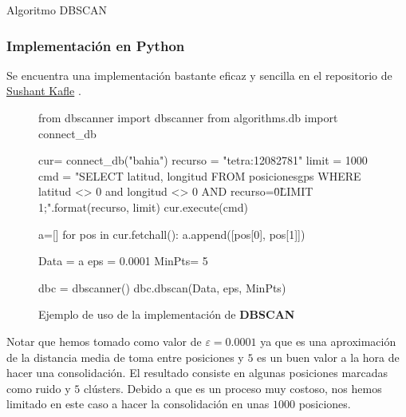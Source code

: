 \documentclass[a4paper, 12pt, spanish]{article}
\begin{document}
\begin{algorithm}[H]\label{DBSCAN}
\begin{algorithmic}[1]
		\Else
			\Else
			\EndIf
		
		\EndIf
	\EndFor
\EndFunction
\State{}
			\EndIf
		\EndIf
		\EndIf
	\EndFor
\EndFunction
\State{}
\EndFunction
\end{algorithmic}
\caption{\label{alg:DBSCAN} Algoritmo DBSCAN}
\end{algorithm}

\subsubsection{Implementaci\'on en Python}

Se encuentra una implementaci\'on bastante eficaz y sencilla en el repositorio de \href{https://github.com/SushantKafle/DBSCAN}{Sushant Kafle} \cite{dbscanPython}.\\

\begin{figure}[H]
\begin{python}
from dbscanner import dbscanner
from algorithms.db import connect_db

cur= connect_db("bahia")
recurso = "tetra:12082781"
limit = 1000
cmd = "SELECT latitud, longitud 
	   FROM posicionesgps 
	   WHERE latitud <> 0 and longitud <> 0 
	   AND recurso=\"{0}\" 
	   LIMIT {1};".format(recurso, limit)
cur.execute(cmd)

a=[]
for pos in cur.fetchall():
    a.append([pos[0], pos[1]])

Data = a
eps = 0.0001
MinPts= 5

dbc = dbscanner()
dbc.dbscan(Data, eps, MinPts)
\end{python}
\caption{Ejemplo de uso de la implementaci\'on de \textbf{DBSCAN}}
\end{figure}
\bigskip
Notar que hemos tomado como valor de $\varepsilon = 0.0001$ ya que es una aproximaci\'on de la distancia media de toma entre posiciones y $5$ es un buen valor a la hora de hacer una consolidaci\'on. El resultado consiste en algunas posiciones marcadas como ruido y $5$ cl\'usters. Debido a que es un proceso muy costoso, nos hemos limitado en este caso a hacer la consolidaci\'on en unas $1000$ posiciones.\\
\end{document}
